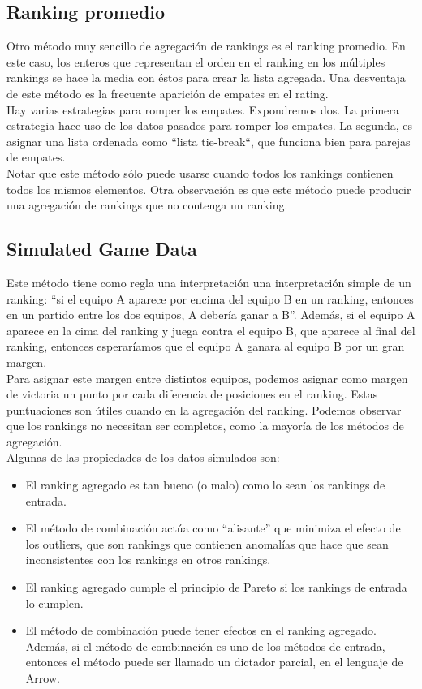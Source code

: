 \subsection{Ranking promedio}  

Otro método muy sencillo de agregación de rankings es el ranking promedio. En este caso, los enteros que representan el orden en el ranking en los múltiples rankings se hace la media con éstos para crear la lista agregada. Una desventaja de este método es la frecuente aparición de empates en el rating. \\

Hay varias estrategias para romper los empates. Expondremos dos. La primera estrategia hace uso de los datos pasados para romper los empates. La segunda, es asignar una lista ordenada como ``lista tie-break``, que funciona bien para parejas de empates.\\

Notar que este método sólo puede usarse cuando todos los rankings contienen todos los mismos elementos. Otra observación es que este método puede producir una agregación de rankings que no contenga un ranking. 

\subsection{Simulated Game Data}

Este método tiene como regla una interpretación una interpretación simple de un ranking: ``si el equipo A aparece por encima del equipo B en un ranking, entonces en un partido entre los dos equipos, A debería ganar a B''. Además, si el equipo A aparece en la cima del ranking y juega contra el equipo B, que aparece al final del ranking, entonces esperaríamos que el equipo A ganara al equipo B por un gran margen.\\

Para asignar este margen entre distintos equipos, podemos asignar como margen de victoria un punto por cada diferencia de posiciones en el ranking. Estas puntuaciones son útiles cuando en la agregación del ranking. Podemos observar que los rankings no necesitan ser completos, como la mayoría de los métodos de agregación.\\

Algunas de las propiedades de los datos simulados son:

\begin{itemize}
\item El ranking agregado es tan bueno (o malo) como lo sean los rankings de entrada.
\item El método de combinación actúa como ``alisante'' que minimiza el efecto de los outliers, que son rankings que contienen  anomalías que hace que sean inconsistentes con los rankings en otros rankings. 
\item El ranking agregado cumple el principio de Pareto si los rankings de entrada lo cumplen.
\item El método de combinación puede tener efectos en el ranking agregado. Además, si el método de combinación es uno de los métodos de entrada, entonces el método puede ser llamado un dictador parcial, en el lenguaje de Arrow.    
\end{itemize}

